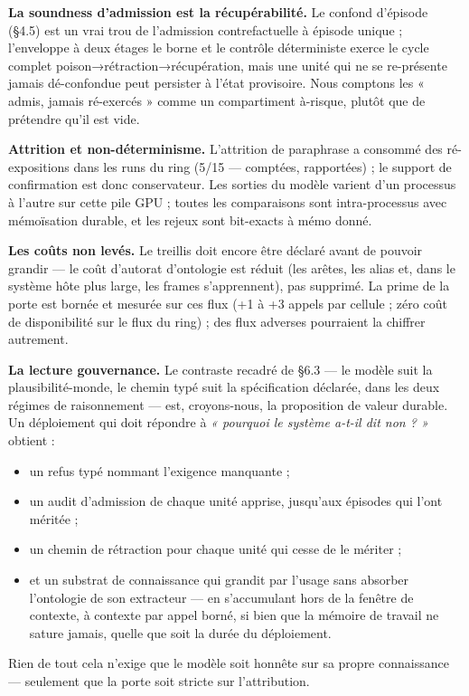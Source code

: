 \documentclass[11pt]{article}
\begin{document}
\textbf{La soundness d'admission est la récupérabilité.} Le confond d'épisode (§4.5) est un vrai trou de l'admission contrefactuelle à épisode unique ; l'enveloppe à deux étages le borne et le contrôle déterministe exerce le cycle complet poison→rétraction→récupération, mais une unité qui ne se re-présente jamais dé-confondue peut persister à l'état provisoire. Nous comptons les « admis, jamais ré-exercés » comme un compartiment à-risque, plutôt que de prétendre qu'il est vide.

\textbf{Attrition et non-déterminisme.} L'attrition de paraphrase a consommé des ré-expositions dans les runs du ring (5/15 — comptées, rapportées) ; le support de confirmation est donc conservateur. Les sorties du modèle varient d'un processus à l'autre sur cette pile GPU ; toutes les comparaisons sont intra-processus avec mémoïsation durable, et les rejeux sont bit-exacts à mémo donné.

\textbf{Les coûts non levés.} Le treillis doit encore être déclaré avant de pouvoir grandir — le coût d'autorat d'ontologie est réduit (les arêtes, les alias et, dans le système hôte plus large, les frames s'apprennent), pas supprimé. La prime de la porte est bornée et mesurée sur ces flux (+1 à +3 appels par cellule ; zéro coût de disponibilité sur le flux du ring) ; des flux adverses pourraient la chiffrer autrement.

\textbf{La lecture gouvernance.} Le contraste recadré de §6.3 — le modèle suit la plausibilité-monde, le chemin typé suit la spécification déclarée, dans les deux régimes de raisonnement — est, croyons-nous, la proposition de valeur durable. Un déploiement qui doit répondre à \emph{« pourquoi le système a-t-il dit non ? »} obtient :

\begin{itemize}
\item un refus typé nommant l'exigence manquante ;
\item un audit d'admission de chaque unité apprise, jusqu'aux épisodes qui l'ont méritée ;
\item un chemin de rétraction pour chaque unité qui cesse de le mériter ;
\item et un substrat de connaissance qui grandit par l'usage sans absorber l'ontologie de son extracteur — en s'accumulant hors de la fenêtre de contexte, à contexte par appel borné, si bien que la mémoire de travail ne sature jamais, quelle que soit la durée du déploiement.
\end{itemize}

Rien de tout cela n'exige que le modèle soit honnête sur sa propre connaissance — seulement que la porte soit stricte sur l'attribution.
\end{document}
